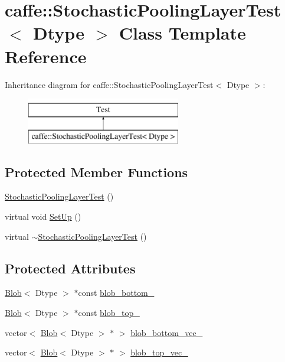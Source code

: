 \hypertarget{classcaffe_1_1_stochastic_pooling_layer_test}{\section{caffe\+:\+:Stochastic\+Pooling\+Layer\+Test$<$ Dtype $>$ Class Template Reference}
\label{classcaffe_1_1_stochastic_pooling_layer_test}
}
Inheritance diagram for caffe\+:\+:Stochastic\+Pooling\+Layer\+Test$<$ Dtype $>$\+:\begin{figure}[H]
\begin{center}
\leavevmode
\includegraphics[height=2.000000cm]{classcaffe_1_1_stochastic_pooling_layer_test}
\end{center}
\end{figure}
\subsection*{Protected Member Functions}
\begin{DoxyCompactItemize}
\item 
\hyperlink{classcaffe_1_1_stochastic_pooling_layer_test_a9dd21f855581fa68d0690a316547a6be}{Stochastic\+Pooling\+Layer\+Test} ()
\item 
virtual void \hyperlink{classcaffe_1_1_stochastic_pooling_layer_test_aab408a9a6775e3c57ec73ae22a9091e7}{Set\+Up} ()
\item 
virtual \hyperlink{classcaffe_1_1_stochastic_pooling_layer_test_aefcd1b521dc12987bf0418612001d151}{$\sim$\+Stochastic\+Pooling\+Layer\+Test} ()
\end{DoxyCompactItemize}
\subsection*{Protected Attributes}
\begin{DoxyCompactItemize}
\item 
\hyperlink{classcaffe_1_1_blob}{Blob}$<$ Dtype $>$ $\ast$const \hyperlink{classcaffe_1_1_stochastic_pooling_layer_test_acfdbcddde109307b6d1c14d4a4a79d99}{blob\+\_\+bottom\+\_\+}
\item 
\hyperlink{classcaffe_1_1_blob}{Blob}$<$ Dtype $>$ $\ast$const \hyperlink{classcaffe_1_1_stochastic_pooling_layer_test_a6a1aef2e44eab8ca1d39d46513d2997b}{blob\+\_\+top\+\_\+}
\item 
vector$<$ \hyperlink{classcaffe_1_1_blob}{Blob}$<$ Dtype $>$ $\ast$ $>$ \hyperlink{classcaffe_1_1_stochastic_pooling_layer_test_a681e00e65c631e315bb9476125814191}{blob\+\_\+bottom\+\_\+vec\+\_\+}
\item 
vector$<$ \hyperlink{classcaffe_1_1_blob}{Blob}$<$ Dtype $>$ $\ast$ $>$ \hyperlink{classcaffe_1_1_stochastic_pooling_layer_test_ac5a8fb017528e7853a1e921a6e475062}{blob\+\_\+top\+\_\+vec\+\_\+}
\end{DoxyCompactItemize}



